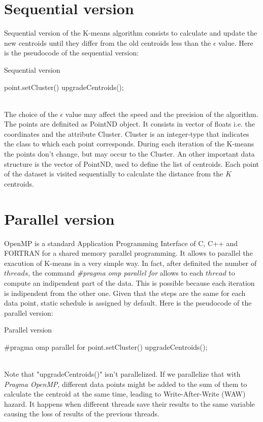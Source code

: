 \documentclass[10pt,twocolumn,letterpaper]{article}
\begin{document}
\section{Sequential version}
Sequential version of the K-means algorithm consists to calculate and update the new centroids until they differ from the old centroids less than the $\epsilon$ value. 
Here is the pseudocode of the sequential version:
\begin{algorithm}
\label{sequenziale}
\caption{Sequential version}
\begin{algorithmic}
			\State point.setCluster()
		\EndFor
    		\State upgradeCentroids();
   	 \EndWhile
\end{algorithmic}
\end{algorithm} 
\\
The choice of the $\epsilon$ value may affect the speed and the precision of the algorithm. The points are definited as PointND object. It consists in vector of floats i.e. the coordinates and the attribute Cluster. Cluster is an integer-type that indicates the class to which each point corresponds. During each iteration of the K-means the points don't change, but may occur to the Cluster. An other important data structure is the vector of PointND, used to define the list of centroids.
Each point of the dataset is visited sequentially to calculate the distance from the $K$ centroids.

\section{Parallel version}
OpenMP  is  a  standard  Application  Programming 
Interface of C, C++ and FORTRAN for a shared memory 
parallel programming. It allows to parallel the exacution of K-means in a very simple way.
In fact, after definited the number of $threads$, the command \emph{\#pragma omp parallel for} allows to each $thread$ to compute an 
indipendent part of the data. This is possible because each iteration is indipendent from the other one.
Given that the steps are the same for each data point, static schedule is assigned by default.
Here is the pseudocode of the parallel version:
\begin{algorithm}
\label{parallelo}
\caption{Parallel version}
\begin{algorithmic}
		\State \#pragma omp parallel for
			\State point.setCluster()
		\EndFor
    		\State upgradeCentroids();
   	 \EndWhile
\end{algorithmic}
\end{algorithm}
\\Note that "upgradeCentroids()" isn't parallelized. If we parallelize that with \emph{Pragma OpenMP}, different data points might be added to the sum of them to calculate the centroid
 at the same time, leading to Write-After-Write (WAW) hazard. It happens when different threads save their results to the same variable causing the loss of results of the previous threads.
\end{document}
